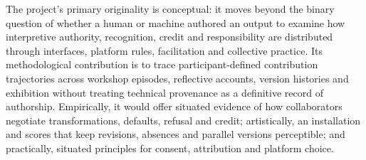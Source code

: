 The project's primary originality is conceptual: it moves beyond the binary
question of whether a human or machine authored an output to examine how
interpretive authority, recognition, credit and responsibility are
distributed through interfaces, platform rules, facilitation and collective
practice. Its methodological contribution is to trace participant-defined
contribution trajectories across workshop episodes, reflective accounts,
version histories and exhibition without treating technical provenance as a
definitive record of authorship. Empirically, it would offer situated
evidence of how collaborators negotiate transformations, defaults, refusal
and credit; artistically, an installation and scores that keep revisions,
absences and parallel versions perceptible; and practically, situated
principles for consent, attribution and platform choice.
